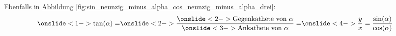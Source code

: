 \documentclass{standalone}
\begin{document}
\begin{frame}{4}
	Ebenfalls in \hyperref[fig:sin_neunzig_minus_alpha_cos_neunzig_minus_alpha_drei]{Abbildung \autoref{fig:sin_neunzig_minus_alpha_cos_neunzig_minus_alpha_drei}}:
	\begin{align}
    \onslide<1->{\tan(\alpha) =} \onslide<2->{\frac{\onslide<2->{\text{Gegenkathete von $\alpha$}}}{\onslide<3->{\text{Ankathete von $\alpha$}}} =} \onslide<4->{\frac{y}{x} = \frac{\sin(\alpha)}{\cos(\alpha)}} \nonumber
	\end{align}
	
\end{frame}
\end{document}
